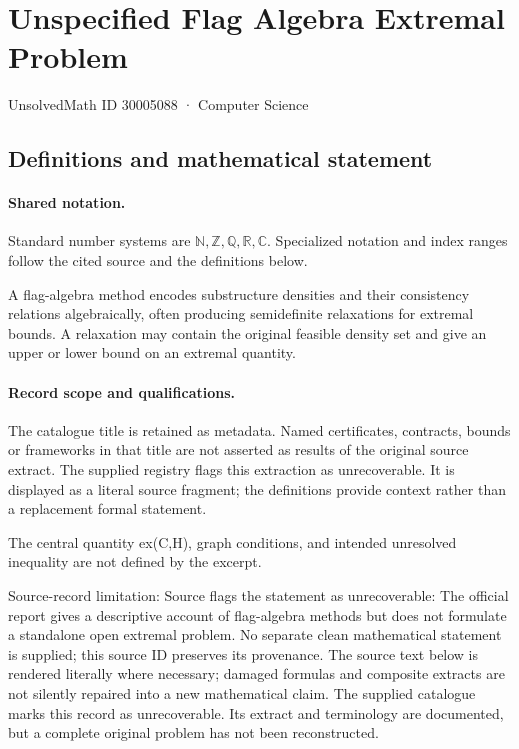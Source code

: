 \documentclass[11pt]{article}
\begin{document}
\setcounter{section}{30005087}
\section{Unspecified Flag Algebra Extremal Problem}\label{30005088}
{\small\sffamily UnsolvedMath ID 30005088 · Computer Science}
\subsection{Definitions and mathematical statement}

\paragraph{Shared notation.}Standard number systems are $\mathbb N,\mathbb Z,\mathbb Q,\mathbb R,\mathbb C$. Specialized notation and index ranges follow the cited source and the definitions below.


A flag-algebra method encodes substructure densities and their consistency relations algebraically, often producing semidefinite relaxations for extremal bounds. A relaxation may contain the original feasible density set and give an upper or lower bound on an extremal quantity.
\paragraph{Record scope and qualifications.}
The catalogue title is retained as metadata. Named certificates, contracts, bounds or frameworks in that title are not asserted as results of the original source extract.
The supplied registry flags this extraction as unrecoverable. It is displayed as a literal source fragment; the definitions provide context rather than a replacement formal statement.

The central quantity ex(C,H), graph conditions, and intended unresolved inequality are not defined by the excerpt.

Source-record limitation: Source flags the statement as unrecoverable: The official report gives a descriptive account of flag-algebra methods but does not formulate a standalone open extremal problem. No separate clean mathematical statement is supplied; this source ID preserves its provenance.
The source text below is rendered literally where necessary; damaged formulas and composite extracts are not silently repaired into a new mathematical claim.
The supplied catalogue marks this record as unrecoverable. Its extract and terminology are documented, but a complete original problem has not been reconstructed.
\end{document}
